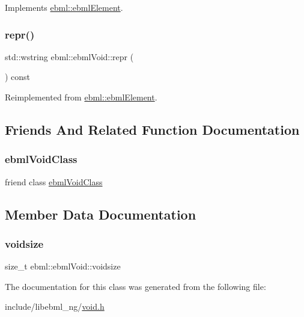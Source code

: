 Implements \mbox{\hyperlink{classebml_1_1ebmlElement_a7852173aeef78bd843939ae5a82f1d1c}{ebml\+::ebml\+Element}}.

\mbox{\label{classebml_1_1ebmlVoid_a54f5a77bc4029d77d0a456fa8dcb53ef}} 
\subsubsection{\texorpdfstring{repr()}{repr()}}
{\footnotesize\ttfamily std\+::wstring ebml\+::ebml\+Void\+::repr (\begin{DoxyParamCaption}{ }\end{DoxyParamCaption}) const\hspace{0.3cm}{\ttfamily [virtual]}}



Reimplemented from \mbox{\hyperlink{classebml_1_1ebmlElement_a77865a71f4bab782817ec82e88fb5198}{ebml\+::ebml\+Element}}.



\subsection{Friends And Related Function Documentation}
\mbox{\label{classebml_1_1ebmlVoid_ac7fd92f117d3b9c559a6d1725f579f9b}} 
\subsubsection{\texorpdfstring{ebml\+Void\+Class}{ebmlVoidClass}}
{\footnotesize\ttfamily friend class \mbox{\hyperlink{classebml_1_1ebmlVoidClass}{ebml\+Void\+Class}}\hspace{0.3cm}{\ttfamily [friend]}}



\subsection{Member Data Documentation}
\mbox{\label{classebml_1_1ebmlVoid_a62a54e4b5ef5acf454f0240db8ee6c90}} 
\subsubsection{\texorpdfstring{voidsize}{voidsize}}
{\footnotesize\ttfamily size\+\_\+t ebml\+::ebml\+Void\+::voidsize}



The documentation for this class was generated from the following file\+:\begin{DoxyCompactItemize}
\item 
include/libebml\+\_\+ng/\mbox{\hyperlink{void_8h}{void.\+h}}\end{DoxyCompactItemize}
